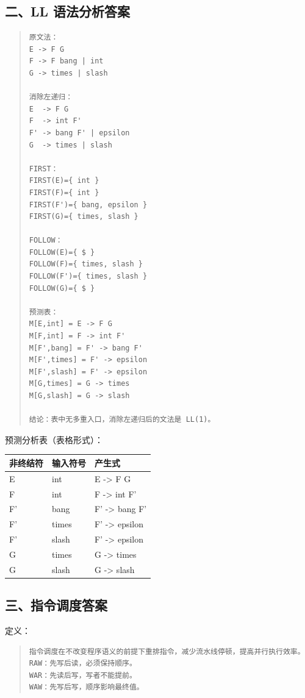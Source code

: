 \documentclass[UTF8,zihao=-4]{ctexart}
\begin{document}
\subsection{二、LL 语法分析答案}


\begin{quote}
\footnotesize
\begin{verbatim}
原文法：
E -> F G
F -> F bang | int
G -> times | slash

消除左递归：
E  -> F G
F  -> int F'
F' -> bang F' | epsilon
G  -> times | slash

FIRST：
FIRST(E)={ int }
FIRST(F)={ int }
FIRST(F')={ bang, epsilon }
FIRST(G)={ times, slash }

FOLLOW：
FOLLOW(E)={ $ }
FOLLOW(F)={ times, slash }
FOLLOW(F')={ times, slash }
FOLLOW(G)={ $ }

预测表：
M[E,int] = E -> F G
M[F,int] = F -> int F'
M[F',bang] = F' -> bang F'
M[F',times] = F' -> epsilon
M[F',slash] = F' -> epsilon
M[G,times] = G -> times
M[G,slash] = G -> slash

结论：表中无多重入口，消除左递归后的文法是 LL(1)。
\end{verbatim}
\end{quote}

预测分析表（表格形式）：

\begin{center}
\footnotesize
\begin{tabular}{lll}
\hline
非终结符 & 输入符号 & 产生式 \\
\hline
E & int & E -> F G \\
F & int & F -> int F' \\
F' & bang & F' -> bang F' \\
F' & times & F' -> epsilon \\
F' & slash & F' -> epsilon \\
G & times & G -> times \\
G & slash & G -> slash \\
\hline
\end{tabular}
\end{center}



\subsection{三、指令调度答案}


定义：


\begin{quote}
\footnotesize
\begin{verbatim}
指令调度在不改变程序语义的前提下重排指令，减少流水线停顿，提高并行执行效率。
RAW：先写后读，必须保持顺序。
WAR：先读后写，写者不能提前。
WAW：先写后写，顺序影响最终值。
\end{verbatim}
\end{quote}
\end{document}
